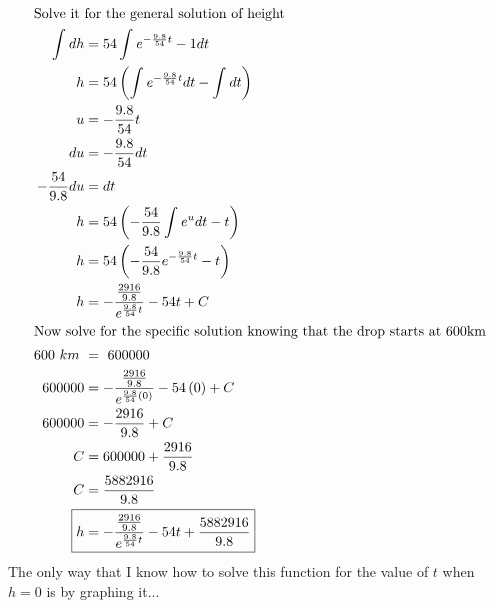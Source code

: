\documentclass[12pt]{article}
\begin{document}
\begin{align}
  \intertext{Solve it for the general solution of height}
  \int_{ }^{ }dh          & =54\int_{ }^{ }e^{-\frac{9.8}{54}t}-1dt                                        \\
  h                       & =54\left(\int_{ }^{ }e^{-\frac{9.8}{54}t}dt-\int_{ }^{ }dt\right)              \\
  u                       & =-\frac{9.8}{54}t                                                              \\
  du                      & =-\frac{9.8}{54}dt                                                             \\
  -\frac{54}{9.8}du       & =dt                                                                            \\
  h                       & =54\left(-\frac{54}{9.8}\int_{ }^{ }e^{u}dt-t\right)                           \\
  h                       & =54\left(-\frac{54}{9.8}e^{-\frac{9.8}{54}t}-t\right)                          \\
  h                       & =-\frac{\frac{2916}{9.8}}{e^{\frac{9.8}{54}t}}-54t+C                           \\
  \intertext{Now solve for the specific solution knowing that the drop starts at 600km}
  600\ km\                & =\ 600000                                                                      \\
  600000                  & =-\frac{\frac{2916}{9.8}}{e^{\frac{9.8}{54}\left(0\right)}}-54\left(0\right)+C \\
  600000                  & =-\frac{2916}{9.8}+C                                                           \\
  C                       & =600000+\frac{2916}{9.8}                                                       \\
  C                       & =\frac{5882916}{9.8}                                                           \\
  \Aboxed{h                       & =-\frac{\frac{2916}{9.8}}{e^{\frac{9.8}{54}t}}-54t+\frac{5882916}{9.8}}
\end{align}
The only way that I know how to solve this function for the value of $t$ when $h=0$ is by graphing it...
\end{document}
